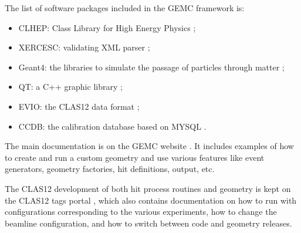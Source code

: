 The list of software packages included in the GEMC framework is:

\begin{itemize}
	\item CLHEP: Class Library for High Energy Physics \cite{clhep};
	\item XERCESC: validating XML parser \cite{xercesc};
	\item Geant4: the libraries to simulate the passage of particles through matter \cite{geant4};
	\item QT: a C++ graphic library \cite{qt};
	\item EVIO: the CLAS12 data format \cite{evio};
	\item CCDB: the calibration database based on MYSQL \cite{ccdb}.
\end{itemize}

The main documentation is on the GEMC website \cite{GEMC}. It includes examples of how to create and run a custom geometry
and use various features like event generators, geometry factories, hit definitions, output, etc.

The CLAS12 development of both hit process routines and geometry is kept on the CLAS12 tags portal \cite{clas12Tags},
which also contains documentation on how to run with configurations corresponding to the various experiments, how to change the
beamline configuration, and how to switch between code and geometry releases.





